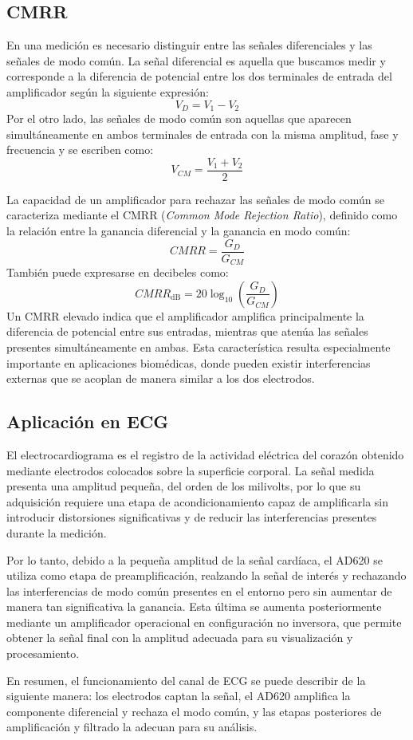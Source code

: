 \subsection{CMRR}
En una medición es necesario distinguir entre las señales diferenciales y las señales de modo común. La señal diferencial es aquella que buscamos medir y corresponde a la diferencia de potencial entre los dos terminales de entrada del amplificador según la siguiente expresión:
\begin{equation} 
V_D = V_1 - V_2 
\end{equation}
Por el otro lado, las señales de modo común son aquellas que aparecen simultáneamente en ambos
 terminales de entrada con la misma amplitud, fase y frecuencia y se escriben como: 
\begin{equation} 
V_{CM} = \frac{V_1 + V_2}{2}
\end{equation}

La capacidad de un amplificador para rechazar las señales de modo común se caracteriza mediante el CMRR (\textit{Common Mode Rejection Ratio}), definido como la relación entre la ganancia diferencial y la ganancia en modo común: 
\begin{equation} 
CMRR = \frac{G_D}{G_{CM}}
\end{equation} 
También puede expresarse en decibeles como: 
\begin{equation}
CMRR_{\mathrm{dB}} = 20\log_{10}\left(\frac{G_D}{G_{CM}}\right)
\end{equation} 
Un CMRR elevado indica que el amplificador amplifica principalmente la diferencia de potencial entre sus entradas, mientras que atenúa las señales presentes simultáneamente en ambas. 
Esta característica resulta especialmente importante en aplicaciones biomédicas, donde pueden existir interferencias externas que se acoplan de manera similar a los dos electrodos. 

\subsection{Aplicación en ECG}
El electrocardiograma es el registro de la actividad eléctrica del corazón obtenido mediante electrodos colocados sobre la superficie corporal.
 La señal medida presenta una amplitud pequeña, del orden de los milivolts, por lo que su adquisición requiere una etapa de acondicionamiento capaz de amplificarla sin introducir distorsiones significativas y de reducir las interferencias presentes durante la medición.
 
Por lo tanto, debido a la pequeña amplitud de la señal cardíaca, el AD620 se utiliza como etapa de preamplificación, realzando la señal de interés y rechazando las interferencias de modo común presentes en el entorno pero sin aumentar de manera tan significativa la ganancia.
 Esta última se aumenta posteriormente mediante un amplificador operacional en configuración no inversora, que permite obtener la señal final con la amplitud adecuada para su visualización y procesamiento.

En resumen, el funcionamiento del canal de ECG se puede describir de la siguiente manera: los electrodos captan la señal, el AD620 amplifica la componente diferencial y rechaza el modo común, y las etapas posteriores de amplificación y filtrado la adecuan para su análisis. 